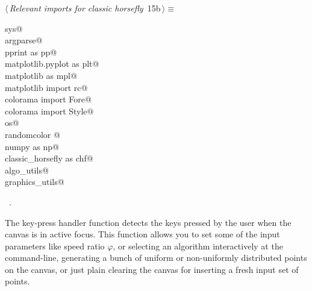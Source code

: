 \documentclass[12pt]{report}
\begin{document}
\newchunk 
\begin{flushleft} \small\label{scrap3}\raggedright\small
{} $\langle\,${\itshape Relevant imports for classic horsefly}\nobreak\ {\footnotesize {15b}}$\,\rangle\equiv$
\vspace{-1ex}
\begin{list}{}{} \item
\mbox{}\verb@import sys@\\
\mbox{}\verb@import argparse@\\
\mbox{}\verb@import pprint as pp@\\
\mbox{}\verb@import matplotlib.pyplot as plt@\\
\mbox{}\verb@import matplotlib as mpl@\\
\mbox{}\verb@from   matplotlib import rc@\\
\mbox{}\verb@from colorama import Fore@\\
\mbox{}\verb@from colorama import Style@\\
\mbox{}\verb@import os@\\
\mbox{}\verb@import randomcolor @\\
\mbox{}\verb@import numpy as np@\\
\mbox{}\verb@import classic_horsefly as chf@\\
\mbox{}\verb@import algo_utils@\\
\mbox{}\verb@import graphics_utils@\\
\mbox{}\verb@@{\NWsep}
\end{list}
\vspace{-1.5ex}
\footnotesize
\begin{list}{}{\setlength{\itemsep}{-\parsep}\setlength{\itemindent}{-\leftmargin}}
\item \NWtxtMacroRefIn\ .

\item{}
\end{list}
\vspace{4ex}
\end{flushleft}
\newchunk The key-press handler function detects the keys pressed by the user when the canvas
is in active focus. This function allows you to set some of the input parameters like 
speed ratio $\varphi$, or selecting an algorithm interactively at the command-line, 
generating a bunch of uniform or non-uniformly distributed points on the canvas, 
or just plain clearing the canvas for inserting a fresh input set of points. 
\end{document}
